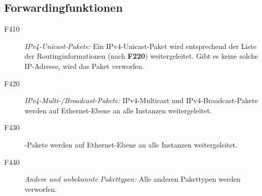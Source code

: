 \subsection{Forwardingfunktionen}
	\begin{description}
		\item[F410] \textit{IPv4-Unicast-Pakete:} Ein IPv4-Unicast-Paket wird entsprechend der Liste der Routinginformationen (nach \textbf{F220}) weitergeleitet. 
		Gibt es keine solche IP-Adresse, wird das Paket verworfen.
		\item[F420] \textit{IPv4-Multi-/Broadcast-Pakete:} IPv4-Multicast und IPv4-Broadcast-Pakete werden auf Ethernet-Ebene an alle Instanzen weitergeleitet.
		\item[F430] \textit{} -Pakete werden auf Ethernet-Ebene an alle Instanzen weitergeleitet.
		\item[F440] \textit{Andere und unbekannte Pakettypen:} Alle anderen Pakettypen werden verworfen.
	\end{description}







